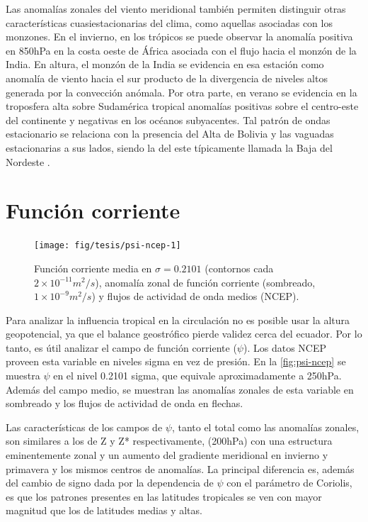 \documentclass[spanish,a4paper,12pt,oneside]{book}
\begin{document}
Las anomalías zonales del viento meridional también permiten distinguir
otras características cuasiestacionarias del clima, como aquellas
asociadas con los monzones. En el invierno, en los trópicos se puede
observar la anomalía positiva en 850hPa en la costa oeste de África
asociada con el flujo hacia el monzón de la India. En altura, el monzón
de la India se evidencia en esa estación como anomalía de viento hacia
el sur producto de la divergencia de niveles altos generada por la
convección anómala. Por otra parte, en verano se evidencia en la
troposfera alta sobre Sudamérica tropical anomalías positivas sobre el
centro-este del continente y negativas en los océanos subyacentes. Tal
patrón de ondas estacionario se relaciona con la presencia del Alta de
Bolivia y las vaguadas estacionarias a sus lados, siendo la del este
típicamente llamada la Baja del Nordeste \autocite{Vera2006}.

\section{Función corriente}\label{funcion-corriente}

\begin{landscape}\begin{figure}

{\centering \texttt{[image: fig/tesis/psi-ncep-1]} 

}

\caption{Función corriente media en $\sigma = 0.2101$ (contornos cada $2\times10^{-11}m^2/s$), anomalía zonal de función corriente (sombreado,  $1\times10^{-9}m^2/s$) y flujos de actividad de onda medios (NCEP).}\label{fig:psi-ncep}
\end{figure}
\end{landscape}

Para analizar la influencia tropical en la circulación no es posible
usar la altura geopotencial, ya que el balance geostrófico pierde
validez cerca del ecuador. Por lo tanto, es útil analizar el campo de
función corriente (\(\psi\)). Los datos NCEP proveen esta variable en
niveles sigma en vez de presión. En la \autoref{fig:psi-ncep} se muestra
\(\psi\) en el nivel 0.2101 sigma, que equivale aproximadamente a
250hPa. Además del campo medio, se muestran las anomalías zonales de
esta variable en sombreado y los flujos de actividad de onda en flechas.

Las características de los campos de \(\psi\), tanto el total como las
anomalías zonales, son similares a los de Z y Z* respectivamente,
(200hPa) con una estructura eminentemente zonal y un aumento del
gradiente meridional en invierno y primavera y los mismos centros de
anomalías. La principal diferencia es, además del cambio de signo dada
por la dependencia de \(\psi\) con el parámetro de Coriolis, es que los
patrones presentes en las latitudes tropicales se ven con mayor magnitud
que los de latitudes medias y altas.
\end{document}
